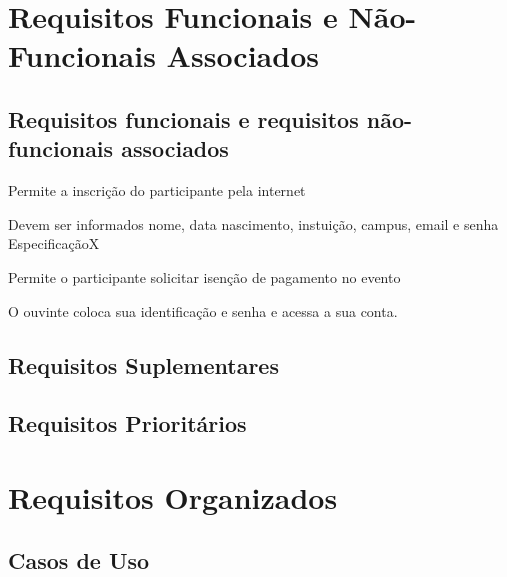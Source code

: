\documentclass[12pt,a4paper]{article}
\begin{document}
        \section{Requisitos Funcionais e Não-Funcionais Associados}
        
        	\subsection{Requisitos funcionais e requisitos não-funcionais associados}
        

		\setcounter{NumberReqF}{0}
		\setcounter{NumberReqNF}{0}
        	
        	{Permite a inscrição do participante pela internet}
        	{%
        	  {Devem ser informados nome, data nascimento, instuição, campus, email e senha}
        	  {Especificação}{X}{}%
        	  
        	  
        	}
        	
        	{Permite o participante solicitar isenção de pagamento no evento}
        	{%
        	}
        	
        	
        	
        	{O ouvinte coloca sua identificação e senha e acessa a sua conta.}
        	{%
        	
        	}
        	        	        	
        	\FloatBarrier	
        	
        	
        	\subsection{Requisitos Suplementares}
        	
        	\subsection{Requisitos Prioritários}
        	
        	\newpage
        	\section{Requisitos Organizados}
	        	\subsection{Casos de Uso}
	        	
\end{document}
